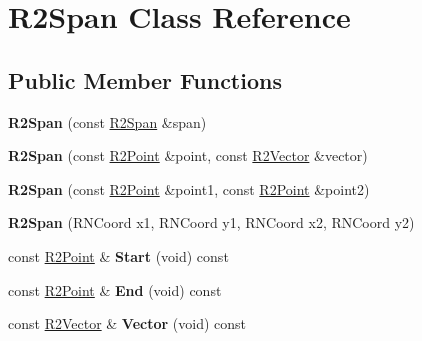 \hypertarget{class_r2_span}{}\section{R2\+Span Class Reference}
\label{class_r2_span}
\subsection*{Public Member Functions}
\begin{DoxyCompactItemize}
\item 
{\bfseries R2\+Span} (const \hyperlink{class_r2_span}{R2\+Span} \&span)\hypertarget{class_r2_span_a3c60ef06c0d0ba51b08e369367aff876}{}\label{class_r2_span_a3c60ef06c0d0ba51b08e369367aff876}

\item 
{\bfseries R2\+Span} (const \hyperlink{class_r2_point}{R2\+Point} \&point, const \hyperlink{class_r2_vector}{R2\+Vector} \&vector)\hypertarget{class_r2_span_acf0c821ea10dab859f29208385d3ee54}{}\label{class_r2_span_acf0c821ea10dab859f29208385d3ee54}

\item 
{\bfseries R2\+Span} (const \hyperlink{class_r2_point}{R2\+Point} \&point1, const \hyperlink{class_r2_point}{R2\+Point} \&point2)\hypertarget{class_r2_span_a7432fd74bb56fac6cc856b646da0f15d}{}\label{class_r2_span_a7432fd74bb56fac6cc856b646da0f15d}

\item 
{\bfseries R2\+Span} (R\+N\+Coord x1, R\+N\+Coord y1, R\+N\+Coord x2, R\+N\+Coord y2)\hypertarget{class_r2_span_ad504e54ba86d8fada5938b3bc97c3e87}{}\label{class_r2_span_ad504e54ba86d8fada5938b3bc97c3e87}

\item 
const \hyperlink{class_r2_point}{R2\+Point} \& {\bfseries Start} (void) const \hypertarget{class_r2_span_ae88dadb214e6fbfd8f9e02801c548bb6}{}\label{class_r2_span_ae88dadb214e6fbfd8f9e02801c548bb6}

\item 
const \hyperlink{class_r2_point}{R2\+Point} \& {\bfseries End} (void) const \hypertarget{class_r2_span_a35092f972b2963f3f7f98af5a29c7a4c}{}\label{class_r2_span_a35092f972b2963f3f7f98af5a29c7a4c}

\item 
const \hyperlink{class_r2_vector}{R2\+Vector} \& {\bfseries Vector} (void) const \hypertarget{class_r2_span_ae3f1b43d779448c2ad4eb033506760ac}{}\label{class_r2_span_ae3f1b43d779448c2ad4eb033506760ac}


\end{DoxyCompactItemize}
